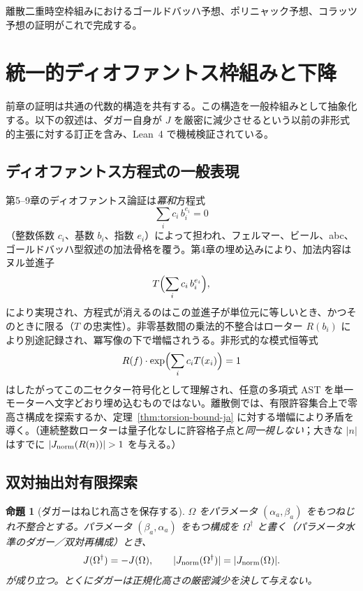 \documentclass[dvipdfmx,a4paper]{article}
\newtheorem{proposition}[theorem]{命題}
\theoremstyle{definition}
\theoremstyle{remark}
\newcommand{\Jnorm}{J_{\rm norm}}
\begin{document}
離散二重時空枠組みにおけるゴールドバッハ予想、ポリニャック予想、コラッツ予想の証明がこれで完成する。

\section{統一的ディオファントス枠組みと下降}

前章の証明は共通の代数的構造を共有する。この構造を一般枠組みとして抽象化する。以下の叙述は、ダガー自身が $J$ を厳密に減少させるという以前の非形式的主張に対する訂正を含み、Lean~4 で機械検証されている。

\subsection{ディオファントス方程式の一般表現}

第5--9章のディオファントス論証は\emph{冪和}方程式
\[
\sum_i c_i\, b_i^{e_i}=0
\]
（整数係数 $c_i$、基数 $b_i$、指数 $e_i$）によって担われ、フェルマー、ビール、abc、ゴールドバッハ型叙述の加法骨格を覆う。第4章の埋め込みにより、加法内容はヌル並進子
\[
T\Bigl(\sum_i c_i\, b_i^{e_i}\Bigr),
\]
により実現され、方程式が消えるのはこの並進子が単位元に等しいとき、かつそのときに限る（$T$ の忠実性）。非零基数間の乗法的不整合はローター $R(b_i)$ により別途記録され、冪写像の下で増幅されうる。非形式的な模式恒等式
\[
R(f) \cdot \exp\Bigl( \sum_i c_i T(x_i) \Bigr) = 1
\]
はしたがってこの二セクター符号化として理解され、任意の多項式 AST を単一モーターへ文字どおり埋め込むものではない。離散側では、有限許容集合上で零高さ構成を探索するか、定理~\ref{thm:torsion-bound-ja} に対する増幅により矛盾を導く。（連続整数ローターは量子化なしに許容格子点と\emph{同一視しない}；大きな $|n|$ はすでに $|\Jnorm(R(n))|>1$ を与える。）

\subsection{双対抽出対有限探索}
\label{sec:unified-descent-ja}

\begin{proposition}[ダガーはねじれ高さを保存する]
\label{prop:dagger-height-ja}
$\Omega$ をパラメータ $(\alpha_a,\beta_a)$ をもつねじれ不整合とする。パラメータ $(\beta_a,\alpha_a)$ をもつ構成を $\Omega^\dagger$ と書く（パラメータ水準のダガー／双対再構成）とき、
\[
J(\Omega^\dagger)=-J(\Omega),\qquad |\Jnorm(\Omega^\dagger)|=|\Jnorm(\Omega)|.
\]
が成り立つ。とくにダガーは正規化高さの厳密減少を決して与えない。
\end{proposition}
\end{document}
